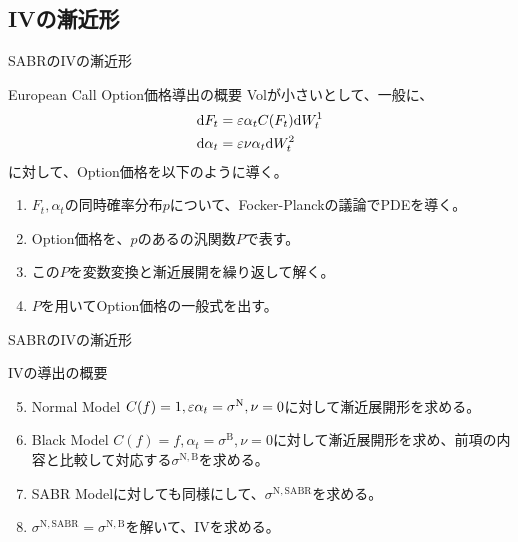 \documentclass[dvipdfmx,9pt]{beamer}
\begin{document}
\subsection{IVの漸近形}
\begin{frame}{SABRのIVの漸近形}
  \begin{block}{European Call Option価格導出の概要}
    Volが小さいとして、一般に、
    \begin{align}
      \dd F_{t}      & = \varepsilon \alpha_{t} C(F_{t}) \dd W_{t}^{1} \\
      \dd \alpha_{t} & = \varepsilon \nu \alpha_{t} \dd W_{t}^{2}
    \end{align}
    に対して、Option価格を以下のように導く。
    \begin{enumerate}
      \item $F_{t},\alpha_{t}$の同時確率分布$p$について、Focker-Planckの議論でPDEを導く。
      \item Option価格を、$p$のあるの汎関数$P$で表す。
      \item この$P$を変数変換と漸近展開を繰り返して解く。
      \item $P$を用いてOption価格の一般式を出す。
    \end{enumerate}
  \end{block}
\end{frame}
\begin{frame}{SABRのIVの漸近形}
  \begin{block}{IVの導出の概要}
    \begin{enumerate}
      \setcounter{enumi}{4}
      \item Normal Model $C(f) = 1, \varepsilon\alpha_{t} = \sigma^{\mathrm{N}},\nu = 0$に対して漸近展開形を求める。
      \item Black Model $C(f) = f, \alpha_{t} = \sigma^{\mathrm{B}},\nu = 0$に対して漸近展開形を求め、前項の内容と比較して対応する$\sigma^{\mathrm{N,B}}$を求める。
      \item SABR Modelに対しても同様にして、$\sigma^{\mathrm{N,SABR}}$を求める。
      \item $\sigma^{\mathrm{N,SABR}} = \sigma^{\mathrm{N,B}}$を解いて、IVを求める。
    \end{enumerate}
  \end{block}
\end{frame}
\end{document}
